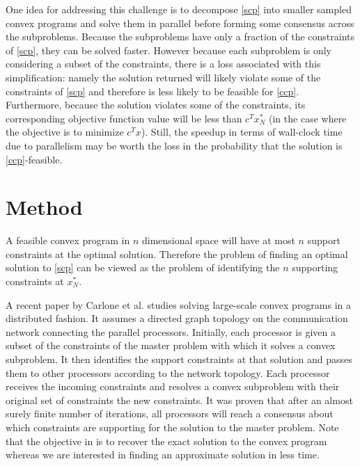 \documentclass[12pt]{article}
\begin{document}
One idea for addressing this challenge is to decompose \ref{scp} into smaller sampled convex programs and solve them in parallel before forming some consensus across the subproblems.
Because the subproblems have only a fraction of the constraints of \ref{scp}, they can be solved faster.
However because each subproblem is only considering a subset of the constraints, there is a loss associated with this simplification: namely the solution returned will likely violate some of the constraints of \ref{scp} and therefore is less likely to be feasible for \ref{ccp}.
Furthermore, because the solution violates some of the constraints, its corresponding objective function value will be less than $c^T x_N^*$ (in the case where the objective is to minimize $c^T x$).
Still, the speedup in terms of wall-clock time due to parallelism may be worth the loss in the probability that the solution is \ref{ccp}-feasible.

\section*{Method}
A feasible convex program in $n$ dimensional space will have at most $n$ support constraints at the optimal solution.
Therefore the problem of finding an optimal solution to \ref{scp} can be viewed as the problem of identifying the $n$ supporting constraints at $x_N^*$.

A recent paper by Carlone et al. \cite{carlone2014} studies solving large-scale convex programs in a distributed fashion.
It assumes a directed graph topology on the communication network connecting the parallel processors.
Initially, each processor is given a subset of the constraints of the master problem with which it solves a convex subproblem.
It then identifies the support constraints at that solution and passes them to other processors according to the network topology.
Each processor receives the incoming constraints and resolves a convex subproblem with their original set of constraints the new constraints.
It was proven that after an almost surely finite number of iterations, all processors will reach a consensus about which constraints are supporting for the solution to the master problem.
Note that the objective in \cite{carlone2014} is to recover the exact solution to the convex program whereas we are interested in finding an approximate solution in less time.
\end{document}
